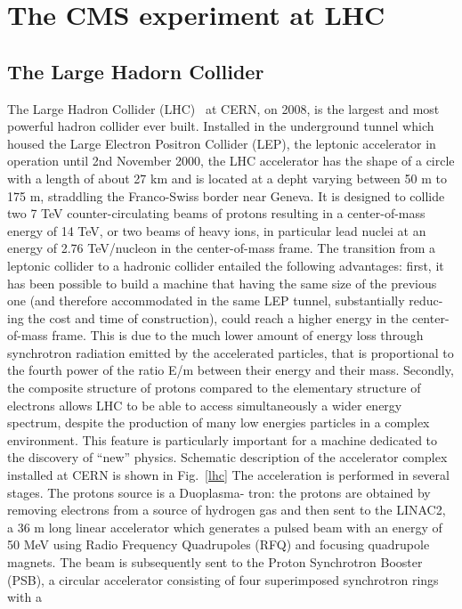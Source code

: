 \chapter{The CMS experiment at LHC}

\section{The Large Hadorn Collider}
The Large Hadron Collider (LHC)~\cite{Pettersson:291782}  at CERN,  on 2008, is the largest and most powerful hadron collider ever built. Installed in the
underground tunnel which housed the Large Electron Positron Collider (LEP),
the leptonic accelerator in operation until 2nd November 2000, the LHC accelerator has
the shape of a circle with a length of about 27 km and is located at a depht varying
between 50 m to 175 m, straddling the Franco-Swiss border near Geneva. It is designed
to collide two 7 TeV counter-circulating beams of protons resulting in a center-of-mass
energy of 14 TeV, or two beams of heavy ions, in particular lead nuclei at an energy of
2.76 TeV/nucleon in the center-of-mass frame.
The transition from a leptonic collider to a hadronic collider entailed the following
advantages: first, it has been possible to build a machine that having the same size of the
previous one (and therefore accommodated in the same LEP tunnel, substantially reduc-
ing the cost and time of construction), could reach a higher energy in the center-of-mass
frame. This is due to the much lower amount of energy loss through synchrotron radiation
emitted by the accelerated particles, that is proportional to the fourth power of the ratio
E/m between their energy and their mass. Secondly, the composite structure of protons
compared to the elementary structure of electrons allows LHC to be able to access simultaneously a wider energy spectrum, despite the production of many low energies particles in a complex environment. This feature is particularly important for a machine dedicated
to the discovery of “new” physics.
Schematic description of the accelerator complex installed at CERN is shown in Fig.~\ref{lhc}
The acceleration is performed in several stages. The protons source is a Duoplasma-
tron: the protons are obtained by removing electrons from a source of hydrogen gas
and then sent to the LINAC2, a 36 m long linear accelerator which generates a pulsed
beam with an energy of 50 MeV using Radio Frequency Quadrupoles (RFQ) and focusing
quadrupole magnets. The beam is subsequently sent to the Proton Synchrotron Booster
(PSB), a circular accelerator consisting of four superimposed synchrotron rings with a
